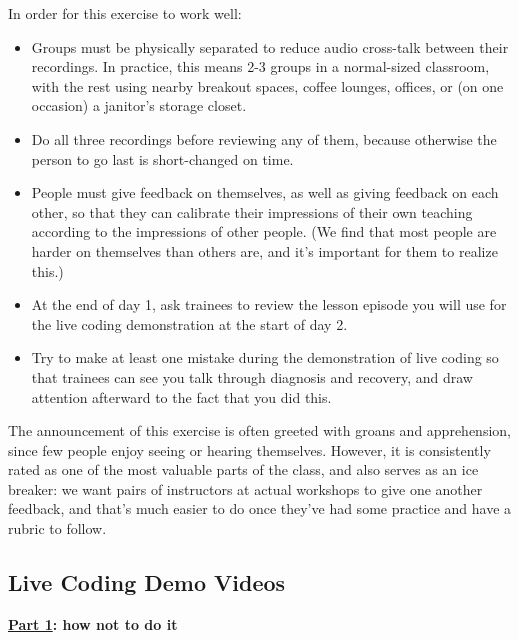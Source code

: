 In order for this exercise to work well:

\begin{itemize}
\item
  Groups must be physically separated to reduce audio cross-talk between
  their recordings. In practice, this means 2-3 groups in a normal-sized
  classroom, with the rest using nearby breakout spaces, coffee lounges,
  offices, or (on one occasion) a janitor's storage closet.
\item
  Do all three recordings before reviewing any of them, because
  otherwise the person to go last is short-changed on time.
\item
  People must give feedback on themselves, as well as giving feedback on
  each other, so that they can calibrate their impressions of their own
  teaching according to the impressions of other people. (We find that
  most people are harder on themselves than others are, and it's
  important for them to realize this.)
\item
  At the end of day 1, ask trainees to review the lesson episode you
  will use for the live coding demonstration at the start of day 2.
\item
  Try to make at least one mistake during the demonstration of live
  coding so that trainees can see you talk through diagnosis and
  recovery, and draw attention afterward to the fact that you did this.
\end{itemize}

The announcement of this exercise is often greeted with groans and
apprehension, since few people enjoy seeing or hearing themselves.
However, it is consistently rated as one of the most valuable parts of
the class, and also serves as an ice breaker: we want pairs of
instructors at actual workshops to give one another feedback, and that's
much easier to do once they've had some practice and have a rubric to
follow.

\subsection{Live Coding Demo Videos}\label{live-coding-demo-videos}

\textbf{\href{https://youtu.be/bXxBeNkKmJE}{Part 1}: how not to do it}

